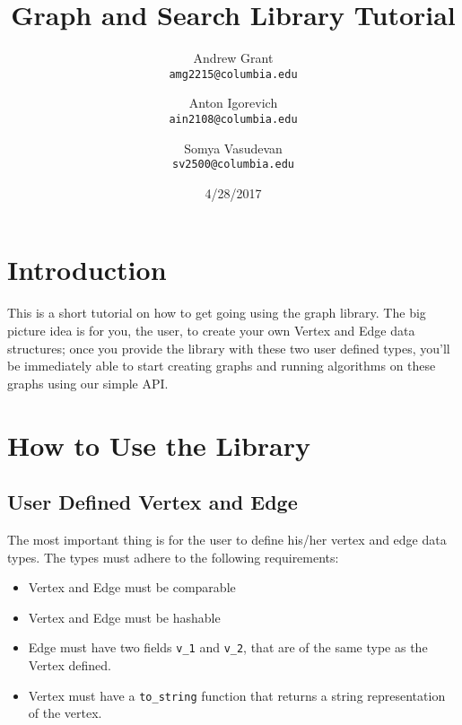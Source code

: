 \documentclass{article}
\title{Graph and Search Library Tutorial}
\author{
Andrew Grant\\
\texttt{amg2215@columbia.edu}
\and 
Anton Igorevich \\
\texttt{ain2108@columbia.edu}
\and
 Somya Vasudevan \\
 \texttt{sv2500@columbia.edu}
}
\date{4/28/2017}
\begin{document}
\maketitle

\section{Introduction}
This is a short tutorial on how to get going using the graph library. The big picture idea is for you, the user, to create your own Vertex and Edge data structures; once you provide the library with these two user defined types, you'll be immediately able to start creating graphs and running algorithms on these graphs using our simple API.

\section{How to Use the Library}
\subsection{User Defined Vertex and Edge}
The most important thing is for the user to define his/her vertex and edge data types. The types must adhere to the following requirements:
\begin{itemize}
\item Vertex and Edge must be comparable
\item Vertex and Edge must be hashable
\item Edge must have two fields \texttt{v\_1} and \texttt{v\_2}, that are of the same type as the Vertex defined.
\item Vertex must have a \texttt{to\_string} function that returns a string representation of the vertex. 
\end{itemize}
\end{document}
